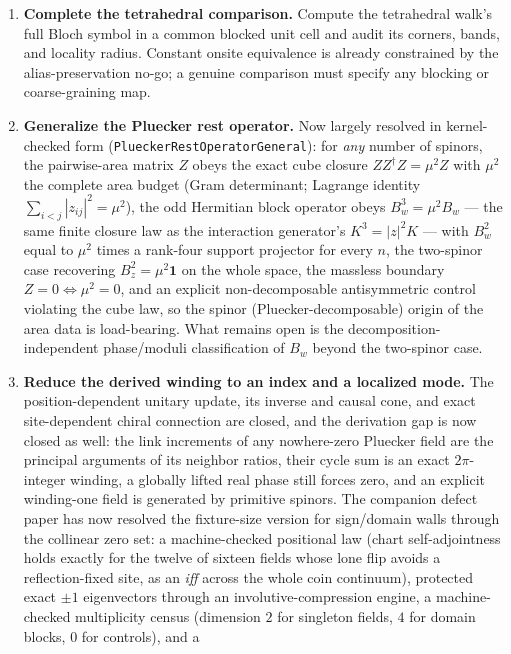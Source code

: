\documentclass[11pt]{article}
\newcommand{\id}{\mathbf{1}}
\begin{document}
\begin{enumerate}[leftmargin=2em]
   Equations
   \eqref{eq:cornerparity} and \eqref{eq:bodycentermodes} are the regression
   tests.
  \item \textbf{Complete the tetrahedral comparison.}
  Compute the tetrahedral walk's full Bloch symbol in a common blocked unit
  cell and audit its corners, bands, and locality radius.  Constant onsite
  equivalence is already constrained by the alias-preservation no-go; a
  genuine comparison must specify any blocking or coarse-graining map.
  \item \textbf{Generalize the Pluecker rest operator.}
  Now largely resolved in kernel-checked form
  (\texttt{PlueckerRestOperatorGeneral}): for \emph{any} number of
  spinors, the pairwise-area matrix $Z$ obeys the exact cube closure
  $ZZ^\dagger Z=\mu^2 Z$ with $\mu^2$ the complete area budget (Gram
  determinant; Lagrange identity $\sum_{i<j}|z_{ij}|^2=\mu^2$), the odd
  Hermitian block operator obeys $B_w^3=\mu^2 B_w$ --- the same finite
  closure law as the interaction generator's $K^3=|z|^2K$ --- with
  $B_w^2$ equal to $\mu^2$ times a rank-four support projector for every
  $n$, the two-spinor case recovering $B_z^2=\mu^2\id$ on the whole
  space, the massless boundary $Z=0\iff\mu^2=0$, and an explicit
  non-decomposable antisymmetric control violating the cube law, so the
  spinor (Pluecker-decomposable) origin of the area data is
  load-bearing.  What remains open is the decomposition-independent
  phase/moduli classification of $B_w$ beyond the two-spinor case.
  \item \textbf{Reduce the derived winding to an index and a localized mode.}
  The position-dependent unitary update, its inverse and causal cone, and exact
  site-dependent chiral connection are closed, and the derivation gap is now
  closed as well: the link increments of any nowhere-zero Pluecker field are
  the principal arguments of its neighbor ratios, their cycle sum is an exact
  $2\pi$-integer winding, a globally lifted real phase still forces zero, and
  an explicit winding-one field is generated by primitive spinors.
  The companion defect paper has now resolved the fixture-size version
  for sign/domain walls through the collinear zero set: a machine-checked
  positional law (chart self-adjointness holds exactly for the twelve of
  sixteen fields whose lone flip avoids a reflection-fixed site, as an
  \emph{iff} across the whole coin continuum), protected exact $\pm1$
  eigenvectors through an involutive-compression engine, a
  machine-checked multiplicity census (dimension $2$ for singleton
  fields, $4$ for domain blocks, $0$ for controls), and a

\end{enumerate}
\end{document}
